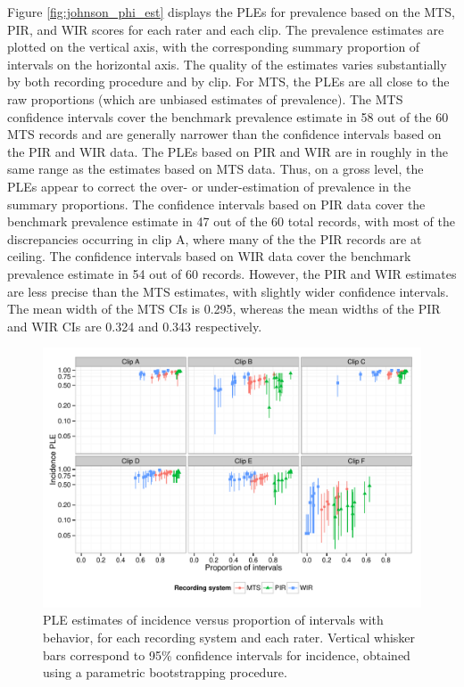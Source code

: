\documentclass[man, noextraspace, floatsintext]{apa6}\usepackage[]{graphicx}\usepackage[]{color}
\makeatletter
\def\maxwidth{ %
  \ifdim\Gin@nat@width>\linewidth
    \linewidth
  \else
    \Gin@nat@width
  \fi
}
\newenvironment{knitrout}{}{} %
\makeatother
\begin{document}
Figure \ref{fig:johnson_phi_est} displays the PLEs for prevalence based on the MTS, PIR, and WIR scores for each rater and each clip. 
The prevalence estimates are plotted on the vertical axis, with the corresponding summary proportion of intervals on the horizontal axis. 
The quality of the estimates varies substantially by both recording procedure and by clip. 
For MTS, the PLEs are all close to the raw proportions (which are unbiased estimates of prevalence). 
The MTS confidence intervals cover the benchmark prevalence estimate in 58 out of the 60 MTS records and are generally narrower than the confidence intervals based on the PIR and WIR data.
The PLEs based on PIR and WIR are in roughly in the same range as the estimates based on MTS data. 
Thus, on a gross level, the PLEs appear to correct the over- or under-estimation of prevalence in the summary proportions. 
The confidence intervals based on PIR data cover the benchmark prevalence estimate in 47 out of the 60 total records, with most of the discrepancies occurring in clip A, where many of the the PIR records are at ceiling. 
The confidence intervals based on WIR data cover the benchmark prevalence estimate in 54 out of 60 records. 
However, the PIR and WIR estimates are less precise than the MTS estimates, with slightly wider confidence intervals. 
The mean width of the MTS CIs is 0.295, whereas the mean widths of the PIR and WIR CIs are 0.324 and 0.343 respectively.

\begin{knitrout}
\color{fgcolor}\begin{figure}[tb]


{\centering \includegraphics[width=\maxwidth]{fig/johnson_zeta_est} 

}

\caption[PLE estimates of incidence versus proportion of intervals with behavior, for each recording system and each rater]{PLE estimates of incidence versus proportion of intervals with behavior, for each recording system and each rater. Vertical whisker bars correspond to 95\% confidence intervals for incidence, obtained using a parametric bootstrapping procedure.\label{fig:johnson_zeta_est}}
\end{figure}


\end{knitrout}
\end{document}
